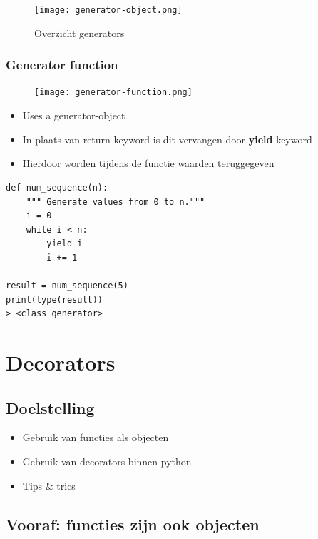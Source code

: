 \documentclass{article}
\begin{document}
\begin{figure}[H]
    \centering
    \texttt{[image: generator-object.png]}
    \caption{Overzicht generators}
\end{figure}

\subsubsection{Generator function}

\begin{figure}[H]
    \centering
    \texttt{[image: generator-function.png]}
\end{figure}

\begin{itemize}
    \item Uses a generator-object
    \item In plaats van return keyword is dit vervangen door \textbf{yield} keyword
    \item Hierdoor worden tijdens de functie waarden teruggegeven
\end{itemize}

\begin{verbatim}
def num_sequence(n):
    """ Generate values from 0 to n."""
    i = 0
    while i < n:
        yield i
        i += 1

result = num_sequence(5)
print(type(result))
> <class generator>
\end{verbatim}

\section{Decorators}

\subsection{Doelstelling}

\begin{itemize}
    \item Gebruik van functies als objecten
    \item Gebruik van decorators binnen python
    \item Tips \& trics
\end{itemize}

\subsection{Vooraf: functies zijn ook objecten}
\end{document}
